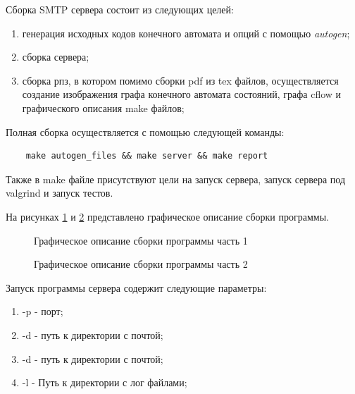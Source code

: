 \documentclass[a4paper,12pt]{report}
\begin{document}
Сборка SMTP сервера состоит из следующих целей:

\begin{enumerate}
	\item генерация исходных кодов конечного автомата и опций с помощью \textit{autogen};
    \item сборка сервера;
    \item сборка рпз, в котором помимо сборки pdf из tex файлов, осуществляется создание изображения графа конечного автомата состояний, графа cflow и графического описания make файлов;
    
\end{enumerate}



Полная сборка осуществляется с помощью следующей команды:
\begin{verbatim}
    make autogen_files && make server && make report
\end{verbatim}

Также в make файле присутствуют цели на запуск сервера, запуск сервера под valgrind и запуск тестов.

На рисунках \ref{ris:mkflow_first} 
и 
\ref{ris:mkflow_second} 
представлено графическое описание сборки программы.

\begin{figure}[h!]
\caption{Графическое описание сборки программы часть 1}
\label{ris:mkflow_first}
\end{figure}

\begin{figure}[h!]
\caption{Графическое описание сборки программы часть 2}
\label{ris:mkflow_second}
\end{figure}

Запуск программы сервера содержит следующие параметры:
\begin{enumerate}
	\item -p - порт;
    \item -d - путь к директории с почтой;
    \item -d - путь к директории с почтой;
    \item -l - Путь к директории с лог файлами;
\end{enumerate}
\end{document}
